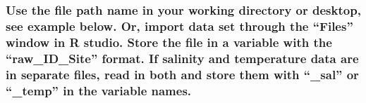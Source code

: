 \documentclass[
]{article}
\begin{document}
\hypertarget{use-the-file-path-name-in-your-working-directory-or-desktop-see-example-below.-or-import-data-set-through-the-files-window-in-r-studio.-store-the-file-in-a-variable-with-the-raw_id_site-format.-if-salinity-and-temperature-data-are-in-separate-files-read-in-both-and-store-them-with-_sal-or-_temp-in-the-variable-names.}{%
\subsubsection{Use the file path name in your working directory or
desktop, see example below. Or, import data set through the ``Files''
window in R studio. Store the file in a variable with the
``raw\_ID\_Site'' format. If salinity and temperature data are in
separate files, read in both and store them with ``\_sal'' or ``\_temp''
in the variable
names.}\label{use-the-file-path-name-in-your-working-directory-or-desktop-see-example-below.-or-import-data-set-through-the-files-window-in-r-studio.-store-the-file-in-a-variable-with-the-raw_id_site-format.-if-salinity-and-temperature-data-are-in-separate-files-read-in-both-and-store-them-with-_sal-or-_temp-in-the-variable-names.}}
\end{document}

